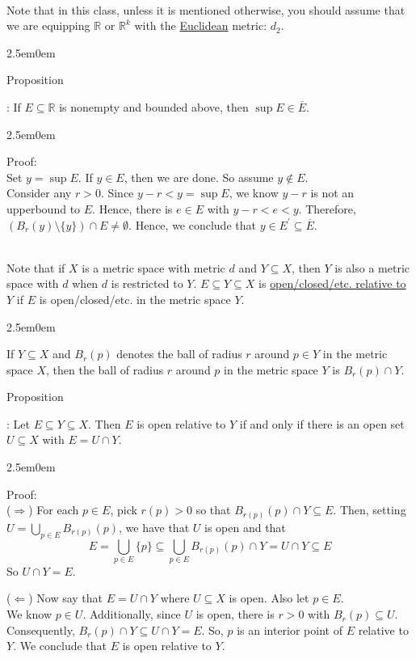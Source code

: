 \documentclass{book}
\newcommand{\hTwo}{%
   \color{MidnightBlue}%
   \fontsize{13}{15}\selectfont%
}
\newcommand{\hThree}{%
   \color{PineGreen}
   \fontsize{13}{15}\selectfont%
}
\newenvironment{myIndent}{%
   \begin{adjustwidth}{2.5em}{0em}%
}{%
   \end{adjustwidth}%
}
\newcommand{\udefine}[1]{%
   \setulcolor{Red}%
   \setul{0.14em}{0.07em}%
   \ul{#1}%
}
\newcommand{\retTwo}{\hfill\bigbreak}
\newcounter{PropNumber}
\newcommand{\propCount}[1][1]{%
   \addtocounter{PropNumber}{#1}%
   \thePropNumber%
}
\newcommand{\mySepTwo}[1][.]{%
   {\noindent\color{#1}{\rule{6.5in}{0.5mm}}}\\%
}
\begin{document}
   \mySepTwo

   Note that in this class, unless it is mentioned otherwise, you should assume that we are equipping $\mathbb{R}$ or $\mathbb{R}^k$ with the \udefine{Euclidean} metric: $d_2$.

   {\begin{myIndent} \hTwo
      Proposition \propCount: If $E \subseteq \mathbb{R}$ is nonempty and bounded above, then $\sup{E} \in \overbar{E}$.

      {\begin{myIndent} \hThree
         Proof:\\
         Set $y = \sup{E}$. If $y \in E$, then we are done. So assume $y \notin E$.\\
         Consider any $r > 0$. Since $y - r < y = \sup{E}$, we know $y-r$ is not an upperbound to $E$. Hence, there is $e \in E$ with $y-r<e<y$. Therefore, $(B_r(y) \setminus \{y\}) \cap E \neq \emptyset$. Hence, we conclude that $y \in E^\prime \subseteq \overbar{E}$. \retTwo
      \end{myIndent}}
   \end{myIndent}}

   \mySepTwo

   Note that if $X$ is a metric space with metric $d$ and $Y \subseteq X$, then $Y$ is also a metric space with $d$ when $d$ is restricted to $Y$. \retTwo
   $E \subseteq Y \subseteq X$ is \udefine{open/closed/etc. relative to $Y$} if $E$ is open/closed/etc. in the metric space $Y$. \retTwo

   {\begin{myIndent} \hTwo
      If $Y \subseteq X$ and $B_r(p)$ denotes the ball of radius $r$ around $p \in Y$ in the metric space $X$, then the ball of radius $r$ around $p$ in the metric space $Y$ is $B_r(p) \cap Y$. \retTwo

      Proposition \propCount: Let $E \subseteq Y \subseteq X$. Then $E$ is open relative to $Y$ if and only if there is an open set $U \subseteq X$ with $E = U \cap Y$.

      {\begin{myIndent} \hThree
         Proof:\\
         ($\Longrightarrow$) For each $p \in E$, pick $r(p) > 0$ so that $B_{r(p)}(p) \cap Y \subseteq E$. Then, setting $U = {\displaystyle \bigcup_{p\in E}{B_{r(p)}(p)}}$, we have that $U$ is open and that \[E = \bigcup_{p\in E}{\{p\}} \subseteq \bigcup_{p\in E}{B_{r(p)}(p)} \cap Y = U \cap Y \subseteq E\]
         So $U \cap Y = E$. \retTwo

         ($\Longleftarrow$) Now say that $E = U \cap Y$ where $U \subseteq X$ is open. Also let $p \in E$.\\ We know $p \in U$. Additionally, since $U$ is open, there is $r > 0$ with $B_r(p) \subseteq U$. Consequently, $B_r(p) \cap Y \subseteq U \cap Y = E$. So, $p$ is an interior point of $E$ relative to $Y$. We conclude that $E$ is open relative to $Y$. \retTwo
      \end{myIndent}}
   \end{myIndent}}
   
\end{document}
